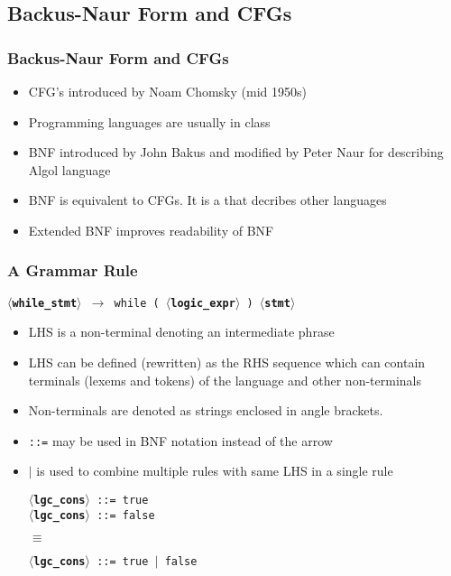 \subsection{Backus-Naur Form and CFGs}
\begin{frame}
\frametitle{Backus-Naur Form and CFGs}
\begin{itemize}
\item CFG's introduced by Noam Chomsky (mid 1950s)
\item Programming languages are usually in  class
\item BNF introduced by John Bakus and modified by Peter Naur for describing Algol language
\item BNF is equivalent to CFGs. It is a  that decribes other languages
\item Extended BNF improves readability of BNF
\end{itemize}
\end{frame}

\newcommand{\nt}[1]{$\langle${\bf #1}$\rangle$}
\begin{frame}
\frametitle{A Grammar Rule}
\texttt{\nt{while\_stmt} $\rightarrow$ while ( \nt{logic\_expr} ) \nt{stmt}}
\begin{itemize}
\item LHS is a non-terminal denoting an intermediate phrase
\item LHS can be defined (rewritten) as the RHS sequence which can contain
	terminals (lexems and tokens) of the language and other non-terminals
\item Non-terminals are denoted as strings enclosed in angle brackets.
\item \texttt{::=} may be used in BNF notation instead of the arrow
\item \texttt{$\mid$} is used to combine multiple rules with same LHS in a single rule\\
	\begin{minipage}[t]{.38\linewidth}
	\small
	\texttt{\nt{lgc\_cons} ::= true}\\
	\texttt{\nt{lgc\_cons} ::= false}\\
	\end{minipage} $\equiv$ \hfill
	\begin{minipage}[c]{.5\linewidth}
	\small
	\texttt{\nt{lgc\_cons} ::= true $\mid$ false }
	\end{minipage}
\end{itemize}
\end{frame}

